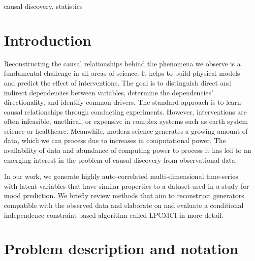 \documentclass[conference]{IEEEtran}
\begin{document}
\begin{IEEEkeywords}
causal discovery, statistics
\end{IEEEkeywords}

\section{Introduction}
Reconstructing the causal relationships behind the phenomena we observe is a fundamental challenge in all areas of science. It helps to build physical models and predict the effect of interventions\cite{pearl_book_2018}.
The goal is to distinguish direct and indirect dependencies between variables, determine the dependencies' directionality, and identify common drivers.
The standard approach is to learn causal relationships through conducting experiments. However, interventions are often infeasible, unethical, or expensive in complex systems such as earth system science or healthcare\cite{runge_inferring_2019}.
Meanwhile, modern science generates a growing amount of data, which we can process due to increases in computational power.
The availability of data and abundance of computing power to process it has led to an emerging interest in the problem of causal discovery from observational data\cite{peters_elements_2018}.

In our work, we generate highly auto-correlated multi-dimensional time-series with latent variables that have similar properties to a dataset used in a study for mood prediction\cite{reiser_predicting_2022}. We briefly review methods that aim to reconstruct generators compatible with the observed data and elaborate on and evaluate a conditional independence constraint-based algorithm called LPCMCI\cite{gerhardus_high-recall_2021} in more detail.
\section{Problem description and notation}
\end{document}
